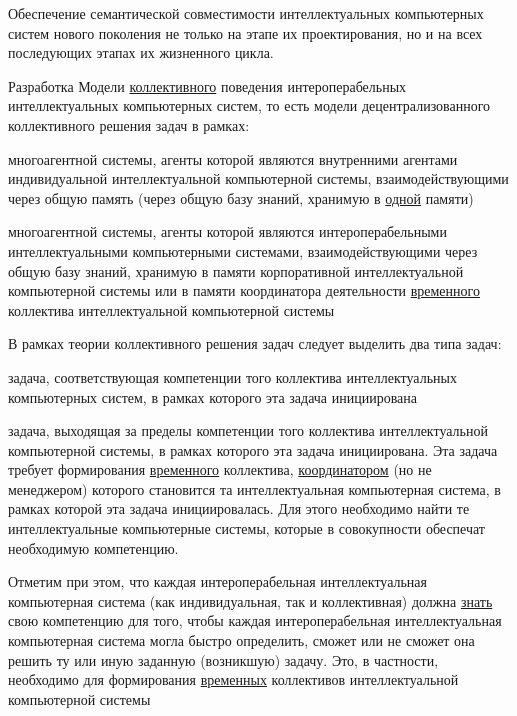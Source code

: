 \begin{textitemize}
	\item Обеспечение семантической совместимости интеллектуальных компьютерных систем нового поколения не только на этапе их проектирования, но и на всех последующих этапах их жизненного цикла.
	\item Разработка Модели \uline{коллективного} поведения интероперабельных интеллектуальных компьютерных систем, то есть модели децентрализованного коллективного решения задач в рамках:
	\begin{textitemize}
		\item многоагентной системы, агенты которой являются внутренними агентами индивидуальной интеллектуальной компьютерной системы, взаимодействующими через общую память (через общую базу знаний, хранимую в \uline{одной} памяти)
		\item многоагентной системы, агенты которой являются интероперабельными интеллектуальными компьютерными системами, взаимодействующими через общую базу знаний, хранимую в памяти корпоративной интеллектуальной компьютерной системы или в памяти координатора деятельности \uline{временного} коллектива интеллектуальной компьютерной системы 
	\end{textitemize}
	\item В рамках теории коллективного решения задач следует выделить два типа задач:
	\begin{textitemize}
		\item задача, соответствующая компетенции того коллектива интеллектуальных компьютерных систем, в рамках которого эта задача инициирована
		\item задача, выходящая за пределы компетенции того коллектива интеллектуальной компьютерной системы, в рамках которого эта задача инициирована. Эта задача требует формирования \uline{временного} коллектива, \uline{координатором} (но не менеджером) которого становится та интеллектуальная компьютерная система, в рамках которой эта задача инициировалась. Для этого необходимо найти те интеллектуальные компьютерные системы, которые в совокупности обеспечат необходимую компетенцию.
	\end{textitemize}
	Отметим при этом, что каждая интероперабельная интеллектуальная компьютерная система (как индивидуальная, так и коллективная) должна \uline{знать} свою компетенцию для того, чтобы каждая интероперабельная интеллектуальная компьютерная система могла быстро определить, сможет или не сможет она решить ту или иную заданную (возникшую) задачу. Это, в частности, необходимо для формирования \uline{временных} коллективов интеллектуальной компьютерной системы

\end{textitemize}

